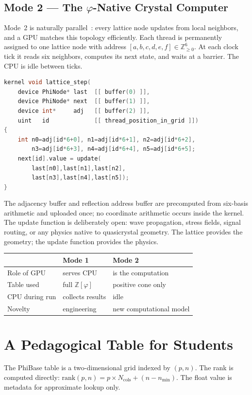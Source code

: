 \documentclass[12pt]{article}
\theoremstyle{definition}
\theoremstyle{remark}
\newcommand{\Z}{\mathbb{Z}}
\newcommand{\Zphi}{\mathbb{Z}[\varphi]}
\begin{document}
\subsection{Mode 2 --- The $\varphi$-Native Crystal Computer}
Mode~2 is naturally parallel~\cite{cellular}: every lattice node
updates from local neighbors, and a GPU matches this topology
efficiently.  Each thread is permanently assigned to one lattice node
with address $[a,b,c,d,e,f]\in\Z_{\geq0}^6$.  At each clock tick it
reads six neighbors, computes its next state, and waits at a barrier.
The CPU is idle between ticks.
\begin{lstlisting}[language=C]
kernel void lattice_step(
    device PhiNode* last  [[ buffer(0) ]],
    device PhiNode* next  [[ buffer(1) ]],
    device int*     adj   [[ buffer(2) ]],
    uint   id             [[ thread_position_in_grid ]])
{
    int n0=adj[id*6+0], n1=adj[id*6+1], n2=adj[id*6+2],
        n3=adj[id*6+3], n4=adj[id*6+4], n5=adj[id*6+5];
    next[id].value = update(
        last[n0],last[n1],last[n2],
        last[n3],last[n4],last[n5]);
}
\end{lstlisting}
The adjacency buffer and reflection address buffer are precomputed
from six-basis arithmetic and uploaded once; no coordinate arithmetic
occurs inside the kernel.
The update function is deliberately open: wave propagation, stress
fields, signal routing, or any physics native to quasicrystal geometry.
The lattice provides the geometry; the update function provides the
physics.
\begin{center}
\renewcommand{\arraystretch}{1.2}
\begin{tabular}{lll}
\toprule
 & Mode 1 & Mode 2 \\
\midrule
Role of GPU & serves CPU & is the computation \\
Table used & full $\Zphi$ & positive cone only \\
CPU during run & collects results & idle \\
Novelty & engineering & new computational model \\
\bottomrule
\end{tabular}
\end{center}
\section{A Pedagogical Table for Students}
\label{sec:teaching}
The PhiBase table is a two-dimensional grid indexed by $(p,n)$.
The rank is computed directly:
$\text{rank}(p,n)=p\times N_\text{cols}+(n-n_\text{min})$.
The float value is metadata for approximate lookup only.
\end{document}
